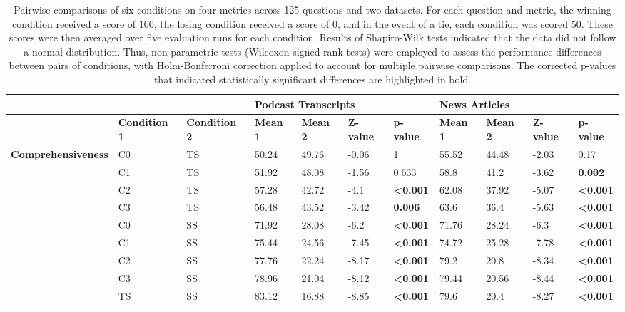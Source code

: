 
\begin{table}[htp]
\tiny
\centering
\caption{Pairwise comparisons of six conditions on four metrics across 125 questions and two datasets. For each question and metric, the winning condition received a score of 100, the losing condition received a score of 0, and in the event of a tie, each condition was scored 50. These scores were then averaged over five evaluation runs for each condition. Results of Shapiro-Wilk tests indicated that the data did not follow a normal distribution. Thus, non-parametric tests (Wilcoxon signed-rank tests) were employed to assess the performance differences between pairs of conditions, with Holm-Bonferroni correction applied to account for multiple pairwise comparisons. The corrected p-values that indicated statistically significant differences are highlighted in bold.}
\begin{tabular}{l l l l l l l l l l l}  
\hline
& & & \multicolumn{4}{l}{\textbf{Podcast Transcripts}} & \multicolumn{4}{l}{\textbf{News Articles}} \\
\hline
& \textbf{Condition 1} & \textbf{Condition 2} & \textbf{Mean 1} & \textbf{Mean 2} & \textbf{Z-value} & \textbf{p-value} & \textbf{Mean 1} & \textbf{Mean 2} & \textbf{Z-value} & \textbf{p-value} \\
 \hline
\multirow{15}{*}{\textbf{Comprehensiveness}} & C0 & TS & 50.24 & 49.76 & -0.06 & 1
& 55.52 & 44.48 & -2.03 & 0.17
\\
 & C1 & TS & 51.92 & 48.08 & -1.56 & 0.633
& 58.8 & 41.2 & -3.62 &\textbf{ 0.002}
\\
 & C2 & TS & 57.28 & 42.72 & -4.1 & \textbf{\textless0.001}
& 62.08 & 37.92 & -5.07 &\textbf{\textless0.001}
\\
 & C3 & TS & 56.48 & 43.52 & -3.42 &\textbf{ 0.006}
& 63.6 & 36.4 & -5.63 & \textbf{\textless0.001}
\\
 & C0 & SS & 71.92 & 28.08 & -6.2 & \textbf{\textless0.001}
& 71.76 & 28.24 & -6.3 & \textbf{\textless0.001}
\\
 & C1 & SS & 75.44 & 24.56 & -7.45 &\textbf{\textless0.001}
& 74.72 & 25.28 & -7.78 & \textbf{\textless0.001}
\\
 & C2 & SS & 77.76 & 22.24 & -8.17 & \textbf{\textless0.001}
& 79.2 & 20.8 & -8.34 & \textbf{\textless0.001}
\\
 & C3 & SS & 78.96 & 21.04 & -8.12 & \textbf{\textless0.001}
& 79.44 & 20.56 & -8.44 & \textbf{\textless0.001}
\\
 & TS & SS & 83.12 & 16.88 & -8.85 & \textbf{\textless0.001}
& 79.6 & 20.4 & -8.27 & \textbf{\textless0.001}

\end{tabular}
\end{table}
